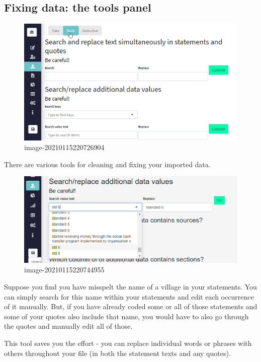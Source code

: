 \documentclass[
]{book}
\begin{document}
\hypertarget{fixing-data-the-tools-panel}{%
\subsection{Fixing data: the tools panel}\label{fixing-data-the-tools-panel}}

\begin{figure}
\centering
\includegraphics{_assets/image-20210115220726904.png}
\caption{image-20210115220726904}
\end{figure}

There are various tools for cleaning and fixing your imported data.

\begin{figure}
\centering
\includegraphics{_assets/image-20210115220744955.png}
\caption{image-20210115220744955}
\end{figure}

Suppose you find you have misspelt the name of a village in your statements. You can simply search for this name within your statements and edit each occurrence of it manually. But, if you have already coded some or all of those statements and some of your quotes also include that name, you would have to also go through the quotes and manually edit all of those.

This tool saves you the effort - you can replace individual words or phrases with others throughout your file (in both the statement texts and any quotes).
\end{document}
